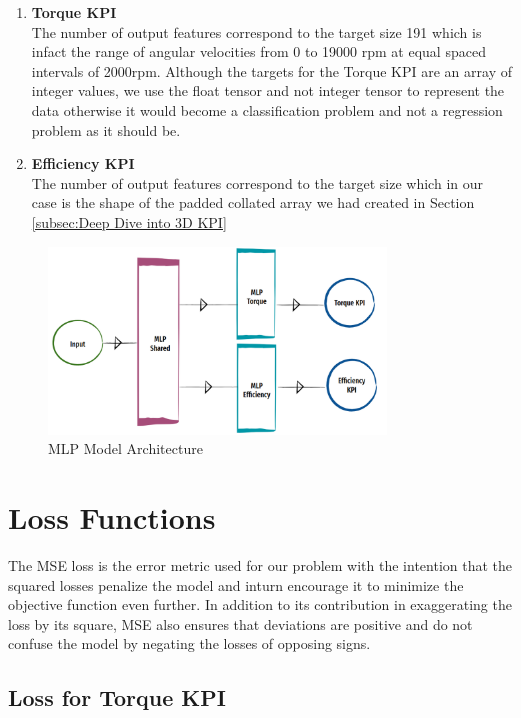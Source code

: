 \documentclass{report} %
\begin{document}
\begin{enumerate}
    \item \textbf{Torque \ac{KPI}} \\
    The number of output features correspond to the target size 191 which is infact the range of angular velocities from 0 to 19000 rpm at equal spaced intervals of 2000rpm.
    Although the targets for the Torque \ac{KPI} are an array of integer values, we use the float tensor and not integer tensor to represent the data otherwise 
    it would become a classification problem and not a regression problem as it should be. 
    \item \textbf{Efficiency \ac{KPI}} \\
    The number of output features correspond to the target size which in our case is the shape of the padded collated array we had created in Section \ref{subsec:Deep Dive into 3D KPI}
\end{enumerate}

\begin{figure}[H]
    \centering
    \includegraphics[width=0.8\textwidth]{./ReportImages/mlp_architecture.png} 
    \caption{\ac{MLP} Model Architecture}
    \label{fig:MLP Model Architecture}
\end{figure}

\section{Loss Functions}\label{sec:Loss Functions}
The \ac{MSE} loss is the error metric used for our problem with the intention that the squared losses penalize the model and inturn encourage it to 
minimize the objective function even further. In addition to its contribution in exaggerating the loss by its square, \ac{MSE} also ensures that deviations are 
positive and do not confuse the model by negating the losses of opposing signs. 
\subsection{Loss for Torque \ac{KPI}}\label{sec:Loss for 2D KPI}
\end{document}
